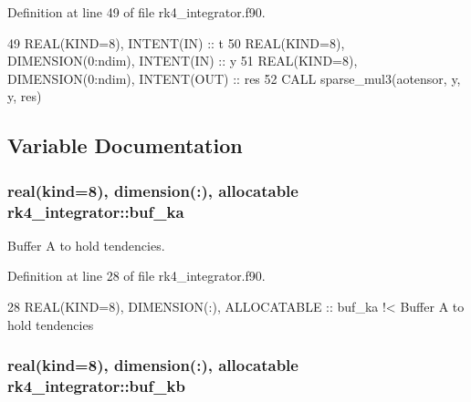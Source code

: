 Definition at line 49 of file rk4\+\_\+integrator.\+f90.


\begin{DoxyCode}
49     \textcolor{keywordtype}{REAL(KIND=8)}, \textcolor{keywordtype}{INTENT(IN)} :: t
50     \textcolor{keywordtype}{REAL(KIND=8)}, \textcolor{keywordtype}{DIMENSION(0:ndim)}, \textcolor{keywordtype}{INTENT(IN)} :: y
51     \textcolor{keywordtype}{REAL(KIND=8)}, \textcolor{keywordtype}{DIMENSION(0:ndim)}, \textcolor{keywordtype}{INTENT(OUT)} :: res
52     \textcolor{keyword}{CALL }sparse\_mul3(aotensor, y, y, res)
\end{DoxyCode}


\subsection{Variable Documentation}
\subsubsection[{\texorpdfstring{buf\+\_\+ka}{buf_ka}}]{\setlength{\rightskip}{0pt plus 5cm}real(kind=8), dimension(\+:), allocatable rk4\+\_\+integrator\+::buf\+\_\+ka\hspace{0.3cm}{\ttfamily [private]}}\hypertarget{namespacerk4__integrator_add2986973e491454b6af98e9a44b12d7}{}\label{namespacerk4__integrator_add2986973e491454b6af98e9a44b12d7}


Buffer A to hold tendencies. 



Definition at line 28 of file rk4\+\_\+integrator.\+f90.


\begin{DoxyCode}
28   \textcolor{keywordtype}{REAL(KIND=8)}, \textcolor{keywordtype}{DIMENSION(:)}, \textcolor{keywordtype}{ALLOCATABLE} :: buf\_ka\textcolor{comment}{ !< Buffer A to hold tendencies}
\end{DoxyCode}
\subsubsection[{\texorpdfstring{buf\+\_\+kb}{buf_kb}}]{\setlength{\rightskip}{0pt plus 5cm}real(kind=8), dimension(\+:), allocatable rk4\+\_\+integrator\+::buf\+\_\+kb\hspace{0.3cm}{\ttfamily [private]}}\hypertarget{namespacerk4__integrator_a5e96789cc7477207582c4115459307c3}{}\label{namespacerk4__integrator_a5e96789cc7477207582c4115459307c3}



